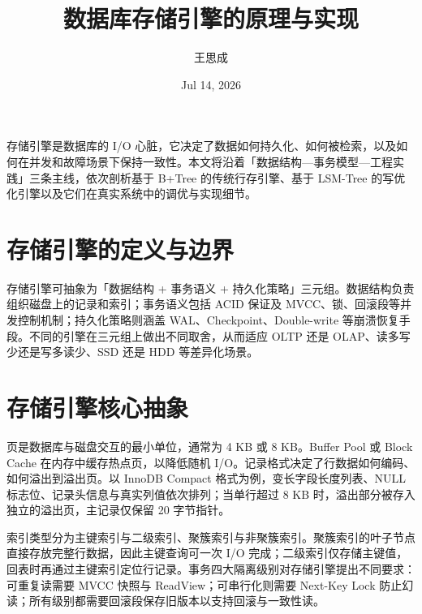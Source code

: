 \title{数据库存储引擎的原理与实现}
\author{王思成}
\date{Jul 14, 2026}
\maketitle
存储引擎是数据库的 I/O 心脏，它决定了数据如何持久化、如何被检索，以及如何在并发和故障场景下保持一致性。本文将沿着「数据结构—事务模型—工程实践」三条主线，依次剖析基于 B+Tree 的传统行存引擎、基于 LSM-Tree 的写优化引擎以及它们在真实系统中的调优与实现细节。\par
\chapter{存储引擎的定义与边界}
存储引擎可抽象为「数据结构 + 事务语义 + 持久化策略」三元组。数据结构负责组织磁盘上的记录和索引；事务语义包括 ACID 保证及 MVCC、锁、回滚段等并发控制机制；持久化策略则涵盖 WAL、Checkpoint、Double-write 等崩溃恢复手段。不同的引擎在三元组上做出不同取舍，从而适应 OLTP 还是 OLAP、读多写少还是写多读少、SSD 还是 HDD 等差异化场景。\par
\chapter{存储引擎核心抽象}
页是数据库与磁盘交互的最小单位，通常为 4 KB 或 8 KB。Buffer Pool 或 Block Cache 在内存中缓存热点页，以降低随机 I/O。记录格式决定了行数据如何编码、如何溢出到溢出页。以 InnoDB Compact 格式为例，变长字段长度列表、NULL 标志位、记录头信息与真实列值依次排列；当单行超过 8 KB 时，溢出部分被存入独立的溢出页，主记录仅保留 20 字节指针。\par
索引类型分为主键索引与二级索引、聚簇索引与非聚簇索引。聚簇索引的叶子节点直接存放完整行数据，因此主键查询可一次 I/O 完成；二级索引仅存储主键值，回表时再通过主键索引定位行记录。事务四大隔离级别对存储引擎提出不同要求：可重复读需要 MVCC 快照与 ReadView；可串行化则需要 Next-Key Lock 防止幻读；所有级别都需要回滚段保存旧版本以支持回滚与一致性读。\par
